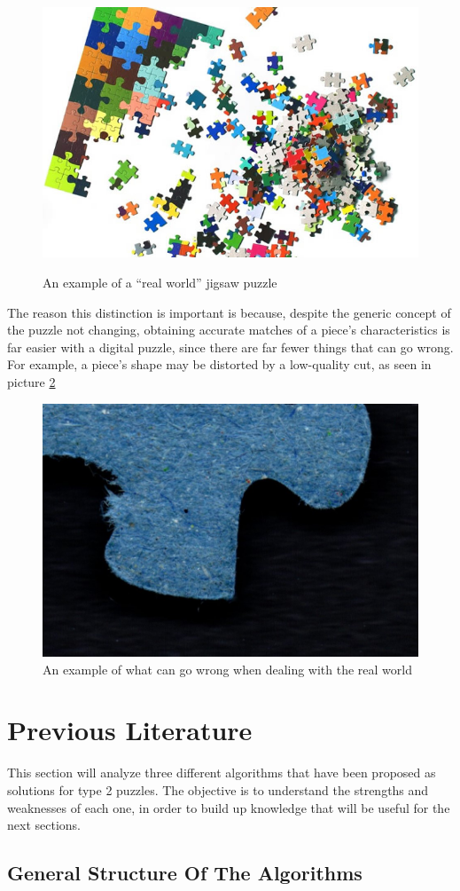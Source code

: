 \documentclass{article}
\begin{document}
\begin{figure}[H]
    \caption{An example of a ``real world'' jigsaw  puzzle}~\label{fig:figure_real_puzzle}
    \includegraphics[height=0.25\textwidth]{pictures/real_puzzle.jpg}
    \centering

\end{figure}

The reason this distinction is important is because,
despite the generic concept of the puzzle not changing,
obtaining accurate matches of a piece's characteristics
is far easier with a digital puzzle,
since there are far fewer things that can go wrong.
For example, a piece's shape may be distorted by
a low-quality cut, as seen in picture \ref{fig:figure_measurement_error}

\begin{figure}[H]
    \caption{An example of what can go wrong when dealing with the real world}\label{fig:figure_measurement_error}
    \includegraphics[height=0.25\textwidth]{pictures/example_bad_piece.jpg}
    \centering
\end{figure}

\section{Previous Literature}
This section will analyze three different algorithms that have been
proposed as solutions for type 2 puzzles.
The objective is to understand the strengths and weaknesses of each one,
in order to build up knowledge that will be useful for the next sections.

\subsection{General Structure Of The Algorithms}
\end{document}
